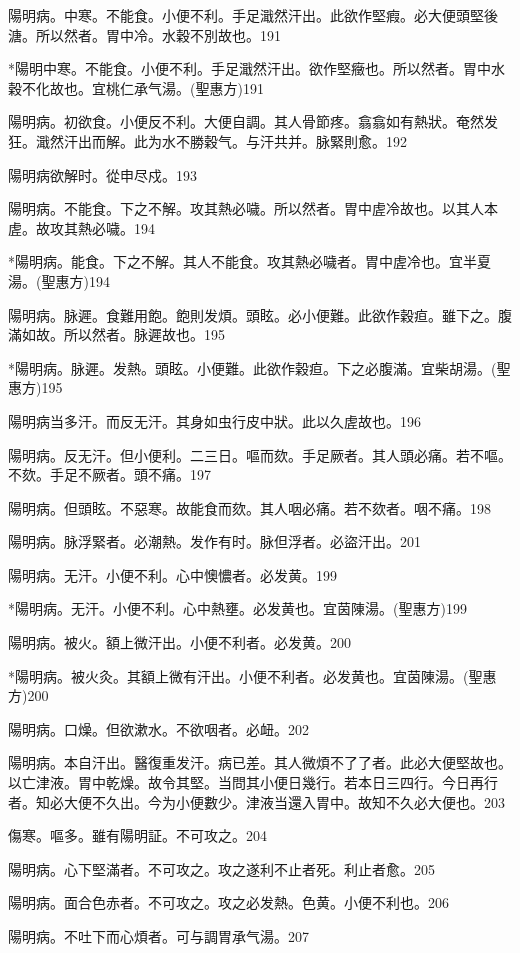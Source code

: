 陽明{\khaaitp 病。}中寒。不能食。小便不利。手足濈然汗出。此欲作堅瘕。必大便頭堅後溏。所以然者。胃中冷。水穀不別故也。191

*陽明中寒。不能食。小便不利。手足濈然汗出。欲作堅癥也。所以然者。胃中水穀不化故也。宜桃仁承气湯。(聖惠方)191

陽明病。初欲食。小便反不利。大便自調。其人骨節疼。翕翕如有熱狀。奄然发狂。濈然汗出而解。此为水不勝穀气。与汗共并。脉緊則愈。192

陽明病欲解时。從申尽戍。193

陽明病。不能食。下之不解。攻其熱必噦。所以然者。胃中虗冷故也。{\khaaitp 以其人本虗。故攻其熱必噦。}194

*陽明病。能食。下之不解。其人不能食。攻其熱必噦者。胃中虗冷也。宜半夏湯。(聖惠方)194

陽明病。脉遲。食難用飽。飽則发煩。頭眩。必小便難。此欲作穀疸。雖下之。腹滿如故。所以然者。脉遲故也。195

*陽明病。脉遲。发熱。頭眩。小便難。此欲作榖疸。下之必腹滿。宜柴胡湯。(聖惠方)195

陽明病当多汗。而反无汗。其身如虫行皮中狀。此以久虗故也。196

陽明病。反无汗。但小便利。二三日。嘔而欬。手足厥者。其人頭必痛。若不嘔。不欬。手足不厥者。頭不痛。197

陽明病。但頭眩。不惡寒。故能食而欬。其人咽必痛。若不欬者。咽不痛。198

陽明病。脉浮緊者。必潮熱。发作有时。{\khaaitp 脉}但浮者。必盜汗出。201

陽明病。无汗。小便不利。心中懊憹者。必发黄。199

*陽明病。无汗。小便不利。心中熱壅。必发黄也。宜茵陳湯。(聖惠方)199

陽明病。被火。額上微汗出。小便不利者。必发黄。200

*陽明病。被火灸。其額上微有汗出。小便不利者。必发黄也。宜茵陳湯。(聖惠方)200

陽明病。口燥。但欲漱水。不欲咽者。必衄。202

陽明病。本自汗出。醫復重发汗。病已差。其人微煩不了了者。此必大便堅故也。以亡津液。胃中乾燥。故令其堅。当問其小便日幾行。若本日三四行。今日再行者。知必大便不久出。今为小便數少。津液当還入胃中。故知不久必大便也。203

傷寒。嘔多。雖有陽明証。不可攻之。204

陽明病。心下堅滿者。不可攻之。攻之遂利不止者死。利止者愈。205

陽明病。面合色赤者。不可攻之。{\khaaitp 攻之}必发熱。色黄。小便不利也。206

陽明病。不吐下而{\khaaitp 心}煩者。可与{\khaaitp 調胃}承气湯。207

